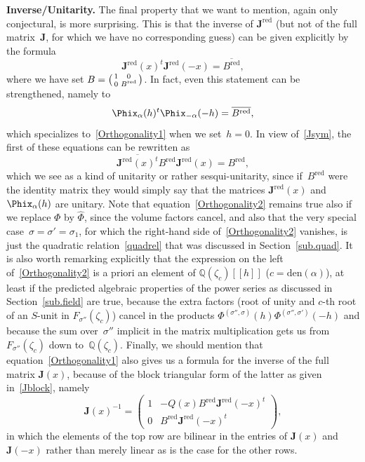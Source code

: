 \documentclass[pdftex]{sigma}
\numberwithin{equation}{section}
\def\z{\zeta}
\def\Phih{\widehat\Phi}
\def\a{\alpha}
\def\Q{\mathbb Q}
\def\i{^{-1}}
\def\a{\alpha}
\def\z{\zeta}
\def\s{\sigma}
\def\sma#1#2#3#4{\bigl(\smallmatrix#1&#2\\#3&#4\endsmallmatrix\bigr)} %
\def\den{\mathrm{den}}
\def\be{\begin{equation}}
\def\ee{\end{equation}}
\def\bJ{J} \def\bJ{\mathbf{J}}
\def\RED{^{\text{red}}}
\def\bJx{\bJ\RED} %
\begin{document}
{\bf Inverse/Unitarity.}
The final property that we want to mention, again only conjectural, is more surprising.
This is that the inverse of $\bJx$ (but not of the full matrix~$\bJ$, for which we
have no corresponding guess) can be given explicitly by the formula
\be
\label{Orthogonality1}
\bJx(x)^t \bJx(-x) = \overline{B\RED} ,
\ee
where we have set $B=\sma 100{B\RED}$. In fact, even this statement can be strengthened,
namely to
\be
\label{Orthogonality2}
\Phix_\a(h)^t \Phix_{-\a}(-h) = \overline{B\RED} ,
\ee
which specializes to~\eqref{Orthogonality1} when we set~$h=0$. In view of~\eqref{Jsym},
the first of these equations can be rewritten as
\[%
 \overline{\bJx(x)^t} B\RED \bJx(x) = B\RED ,
\]
which we see as a kind of unitarity or rather sesqui-unitarity, since if~$B\RED$ were
the identity matrix they would simply say that the matrices $\bJx(x)$ and~$\Phix_\a(h)$
are unitary.
Note that equation~\eqref{Orthogonality2}
remains true also if we replace $\Phi$ by $\Phih$, since the volume factors cancel,
and also that the very special case~$\s=\s'=\s_1$, for which
the right-hand side of~\eqref{Orthogonality2} vanishes, is just the quadratic
relation~\eqref{quadrel} that was discussed in Section~\ref{sub.quad}. It is
also worth remarking explicitly that the expression on the left of~\eqref{Orthogonality2}
is a priori an element of $\Q(\z_c)[[h]]$ ($c=\den(\a)$), at least if the predicted
algebraic properties of the power series \smash{$\Phi_\a^{(\s,\s')}$} as discussed in
Section~\ref{sub.field} are true, because the extra factors (root of unity and $c$-th
root of an $S$-unit in $F_{\s''}(\z_c)$) cancel in the products
$\Phi^{(\s'',\s)}(h)\Phi^{(\s'',\s')}(-h)$ and because the sum over~$\s''$ implicit
in the matrix multiplication gets us from $F_{\s''}(\z_c)$ down to~$\Q(\z_c)$.
Finally, we should mention that equation~\eqref{Orthogonality1}
also gives us a formula for the inverse of the full matrix $\bJ(x)$, because of the block
triangular form of the latter as given in~\eqref{Jblock}, namely
\[ \bJ(x)\i = \begin{pmatrix} 1 & -Q(x)B\RED \bJx(-x)^t \\
 0 & B\RED \bJx(-x)^t \end{pmatrix} ,
\]
in which the elements of the top row are bilinear in the entries of $\bJ(x)$ and
$\bJ(-x)$ rather than merely linear as is the case for the other rows.
\end{document}
